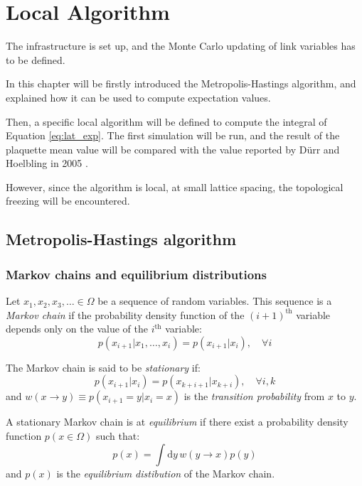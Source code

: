 \chapter{Local Algorithm}\label{ch:local}

The infrastructure is set up, and the Monte Carlo updating of link variables has to be defined.

In this chapter will be firstly introduced the Metropolis-Hastings algorithm,
and explained how it can be used to compute expectation values.

Then, a specific local algorithm will be defined to compute the integral of Equation \eqref{eq:lat_exp}.
The first simulation will be run,
and the result of the plaquette mean value will be compared with the value reported by D\"urr and Hoelbling in 2005 \cite{durr-hoelbling:2005}.

However, since the algorithm is local, at small lattice spacing, the topological freezing will be encountered.

\section{Metropolis-Hastings algorithm}

\subsection*{Markov chains and equilibrium distributions}
Let $x_1, x_2, x_3, \ldots \in \Omega$ be a sequence of random variables.
This sequence is a \emph{Markov chain} if the probability density function of the $(i+1)^\mathrm{th}$ variable depends only on the value of the $i^\mathrm{th}$ variable:
\[
	p(x_{i+1}|x_1, \ldots, x_i) = p(x_{i+1}|x_i), \quad \forall i
\]

The Markov chain is said to be \emph{stationary} if:
\[
	p(x_{i+1}|x_i) = p(x_{k+i+1}|x_{k+i}), \quad \forall i,k
\]
and $w(x \to y) \equiv p(x_{i+1}=y|x_i=x)$ is the \emph{transition probability} from $x$ to $y$.

A stationary Markov chain is at \emph{equilibrium} if there exist a probability density function $p(x \in \Omega)$ such that:
\begin{equation}\label{eq:equilibrium}
	p(x) = \int\mathrm dy\,w(y \to x)p(y)
\end{equation}
and $p(x)$ is the \emph{equilibrium distibution} of the Markov chain.

